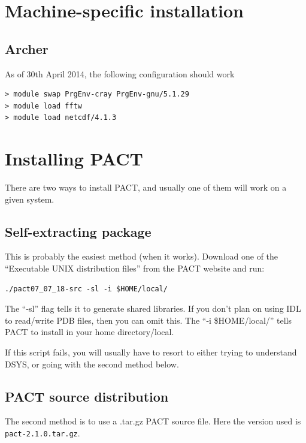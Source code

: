 \documentclass[12pt]{article}
\begin{document}
\appendix





\section{Machine-specific installation}
%
\label{apx:machineinstructions}
%



\subsection{Archer}
%
As of 30th April 2014, the following configuration should work
%
\begin{verbatim}
> module swap PrgEnv-cray PrgEnv-gnu/5.1.29
> module load fftw
> module load netcdf/4.1.3
\end{verbatim}
%





\section{Installing PACT}
%
\label{apx:pact}
%
%
There are two ways to install PACT, and usually one of them will work on a
given system.



\subsection{Self-extracting package}
%
This is probably the easiest method (when it works). Download one of the
``Executable UNIX distribution files'' from the PACT website and run:
%
\begin{verbatim}
./pact07_07_18-src -sl -i $HOME/local/
\end{verbatim}
%
The ``-sl'' flag tells it to generate shared libraries. If you don't plan on
using IDL to read/write PDB files, then you can omit this. The ``-i
\$HOME/local/'' tells PACT to install in your home directory/local.

If this script fails, you will usually have to resort to either trying to
understand DSYS, or going with the second method below.



\subsection{PACT source distribution}
%
The second method is to use a .tar.gz PACT source file. Here the version used
is \texttt{pact-2.1.0.tar.gz}.
\end{document}
